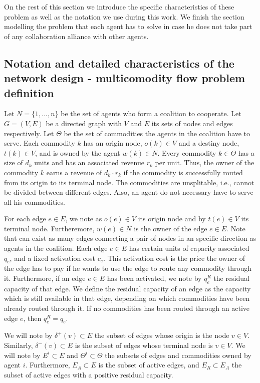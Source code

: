 \documentclass{article}
\begin{document}
On the rest of this section we introduce the specific characteristics of these problem as well as the notation we use during this work. We finish the section modelling the problem that each agent has to solve in case he does not take part of any collaboration alliance with other agents.

\subsection{Notation and detailed characteristics of the network design - multicomodity flow problem definition}
Let $N=\{1,...,n\}$ be the set of agents who form a coalition to cooperate. Let $G=(V,E)$ be a directed graph with
$V$ and $E$ its sets of nodes and edges respectively. 
Let $\Theta$ be the set of commodities the agents in the coalition have to serve. Each commodity $k$ has an origin node, $o(k)\in V$ and a destiny node, $t(k)\in V$, and is owned by the agent $w(k)\in N$. Every commodity $k\in\Theta$ has a size of $d_k$ units and has an associated revenue $r_k$ per unit. Thus, the owner of the commodity $k$ earns a revenue of $d_k\cdot r_k$ if the commodity is successfully routed from its origin to its terminal node. The commodities are unsplitable, i.e., cannot be divided between different edges. Also, an agent do not necessary have to serve all his commodities.

For each edge $e \in E$, we note as $o(e)\in V$ its origin node and by $t(e)\in V$ its terminal node. Furtheremore, $w(e)\in N$ is the owner of the edge $e\in E$. Note that can exist as many edges connecting a pair of nodes in an specific direction as agents in the coalition. Each edge $e \in E$ has certain units of capacity associated $q_e$, and a fixed activation
cost $c_e$. This activation cost is the price the owner of the edge has to pay if he wants to use the edge to route any commodity through it. Furthermore, if an edge $e\in E$ has been activated, we note by $q_e^R$ the residual capacity of that edge. We define the residual capacity of an edge as the capacity which is still available in that edge, depending on which commodities have been already routed through it. If no commodities has been routed through an active edge $e$, then $q_e^R = q_e$.

We will note by $\delta^+(v)\subset E$ the subset of edges whose origin is the node $v\in V$. Similarly, $\delta^-(v)\subset E$ is the subset of edges whose terminal node is $v\in V$. We will note by $E^i \subset E$ and $\Theta^i\subset \Theta$ the subsets of edges and commodities owned by agent $i$. Furthermore, $E_A\subset E$ is the subset of active edges, and $E_R\subset E_A$ the subset of active edges with a positive residual capacity. 
\end{document}
